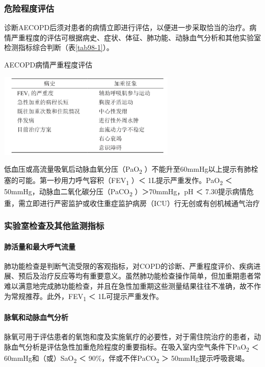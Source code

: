 \subsubsection{危险程度评估}

诊断AECOPD后须对患者的病情立即进行评估，以便进一步采取恰当的治疗。病情严重程度的评估可根据病史、症状、体征、肺功能、动脉血气分析和其他实验室检测指标综合判断（表\ref{tab98-1}）。

\begin{table}[htbp]
\centering
\caption{AECOPD病情严重程度评估}
\label{tab98-1}
\includegraphics[width=3.35417in,height=1.58333in]{./images/Image00399.jpg}
\end{table}

低血压或高流量吸氧后动脉血氧分压（PaO\textsubscript{2}
）不能升至60mmHg以上提示有肺栓塞的可能。第一秒用力呼气容积（FEV\textsubscript{1}
）＜ 1L提示严重发作。PaO\textsubscript{2} ＜
50mmHg，动脉血二氧化碳分压（PaCO\textsubscript{2} ）＞70mmHg，pH ＜
7.30提示病情危重，需立即进行严密监护或收住重症监护病房（ICU）行无创或有创机械通气治疗

\subsubsection{实验室检查及其他监测指标}

\paragraph{肺活量和最大呼气流量}

肺功能检查是判断气流受限的客观指标，对COPD的诊断、严重程度评价、疾病进展、预后及治疗反应等均有重要意义。虽然肺功能检查操作简单，但加重期患者常难以满意地完成肺功能检查，并且在急性加重期这些测量结果往往不准确，故不作为常规推荐。此外，FEV\textsubscript{1}
＜ 1L可提示严重发作。

\paragraph{脉氧和动脉血气分析}

脉氧可用于评估患者的氧饱和度及实施氧疗的必要性，对于需住院治疗的患者，动脉血气分析是评估急性加重危险程度的重要指标。在吸入室内空气条件下PaO\textsubscript{2}
＜ 60mmHg和（或）SaO\textsubscript{2} ＜
90\%，伴或不伴PaCO\textsubscript{2} ＞ 50mmHg提示呼吸衰竭。


